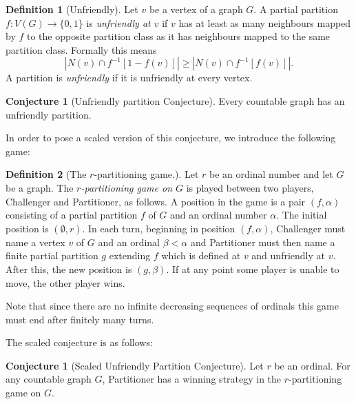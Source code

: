 \documentclass[12pt]{article}
\numberwithin{equation}{section}
\theoremstyle{definition}
\newtheorem{definition}{Definition}
\newtheorem{conjecture}[theorem]{Conjecture}
\begin{document}
\begin{enumerate}
\begin{definition}[Unfriendly]
Let $v$ be a vertex of a graph $G$. A partial partition $f \colon V(G) \to \{0,1\}$ is {\em unfriendly at $v$} if $v$ has at least as many neighbours mapped by $f$ to the opposite partition class as it has neighbours mapped to the same partition class. Formally this means
$$|N(v) \cap f^{-1}[1 - f(v)]| \ge |N(v) \cap f^{-1}[f(v)]|.$$
A partition is {\em unfriendly} if it is unfriendly at every vertex.
\end{definition}

\begin{conjecture}[Unfriendly partition Conjecture]
Every countable graph has an unfriendly partition.
\end{conjecture}

In order to pose a scaled version of this conjecture, we introduce the following game:

\begin{definition}[The $r$-partitioning game.]
Let $r$ be an ordinal number and let $G$ be a graph. The {\em $r$-partitioning game on $G$} is played between two players, Challenger and Partitioner, as follows. A position in the game is a pair $(f, \alpha)$ consisting of a partial partition $f$ of $G$ and an ordinal number $\alpha$. The initial position is $(\emptyset, r)$. In each turn, beginning in position $(f, \alpha)$, Challenger must name a vertex $v$ of $G$ and an ordinal $\beta < \alpha$ and Partitioner must then name a finite partial partition $g$ extending $f$ which is defined at $v$ and unfriendly at $v$. After this, the new position is $(g, \beta)$. If at any point some player is unable to move, the other player wins.
\end{definition}

Note that since there are no infinite decreasing sequences of ordinals this game must end after finitely many turns. 

The scaled conjecture is as follows:

\begin{conjecture}[Scaled Unfriendly Partition Conjecture]
Let $r$ be an ordinal. For any countable graph $G$, Partitioner has a winning strategy in the $r$-partitioning game on $G$.
\end{conjecture}
\end{enumerate}

\newpage

\printbibliography 
\end{document}
